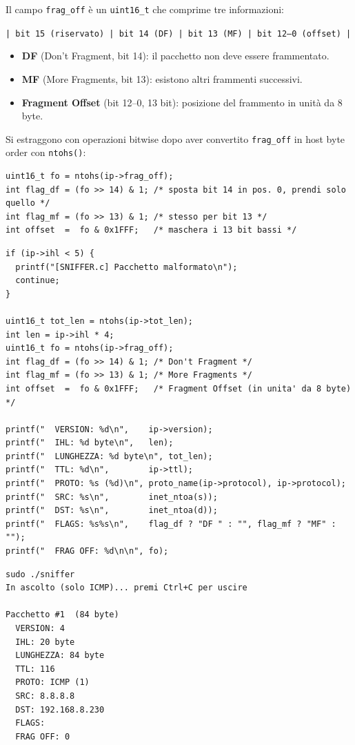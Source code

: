 \documentclass[a4paper,12pt]{article}
\begin{document}
Il campo \texttt{frag\_off} è un \texttt{uint16\_t} che comprime tre informazioni:

\begin{center}
\texttt{| bit 15 (riservato) | bit 14 (DF) | bit 13 (MF) | bit 12--0 (offset) |}
\end{center}

\begin{itemize}
  \item \textbf{DF} (Don't Fragment, bit 14): il pacchetto non deve essere frammentato.
  \item \textbf{MF} (More Fragments, bit 13): esistono altri frammenti successivi.
  \item \textbf{Fragment Offset} (bit 12--0, 13 bit): posizione del frammento in unità da 8 byte.
\end{itemize}

Si estraggono con operazioni bitwise dopo aver convertito \texttt{frag\_off} in host byte
order con \texttt{ntohs()}:

\begin{lstlisting}[caption={Estrazione flag e offset da frag\_off}]
uint16_t fo = ntohs(ip->frag_off);
int flag_df = (fo >> 14) & 1; /* sposta bit 14 in pos. 0, prendi solo quello */
int flag_mf = (fo >> 13) & 1; /* stesso per bit 13 */
int offset  =  fo & 0x1FFF;   /* maschera i 13 bit bassi */
\end{lstlisting}

\begin{lstlisting}[caption={Decodifica completa header IP}]
if (ip->ihl < 5) {
  printf("[SNIFFER.c] Pacchetto malformato\n");
  continue;
}

uint16_t tot_len = ntohs(ip->tot_len);
int len = ip->ihl * 4;
uint16_t fo = ntohs(ip->frag_off);
int flag_df = (fo >> 14) & 1; /* Don't Fragment */
int flag_mf = (fo >> 13) & 1; /* More Fragments */
int offset  =  fo & 0x1FFF;   /* Fragment Offset (in unita' da 8 byte) */

printf("  VERSION: %d\n",    ip->version);
printf("  IHL: %d byte\n",   len);
printf("  LUNGHEZZA: %d byte\n", tot_len);
printf("  TTL: %d\n",        ip->ttl);
printf("  PROTO: %s (%d)\n", proto_name(ip->protocol), ip->protocol);
printf("  SRC: %s\n",        inet_ntoa(s));
printf("  DST: %s\n",        inet_ntoa(d));
printf("  FLAGS: %s%s\n",    flag_df ? "DF " : "", flag_mf ? "MF" : "");
printf("  FRAG OFF: %d\n\n", fo);
\end{lstlisting}

\begin{lstlisting}[language={}, caption={Output -- ping -c 3 8.8.8.8}]
sudo ./sniffer
In ascolto (solo ICMP)... premi Ctrl+C per uscire

Pacchetto #1  (84 byte)
  VERSION: 4
  IHL: 20 byte
  LUNGHEZZA: 84 byte
  TTL: 116
  PROTO: ICMP (1)
  SRC: 8.8.8.8
  DST: 192.168.8.230
  FLAGS:
  FRAG OFF: 0
\end{lstlisting}
\end{document}
